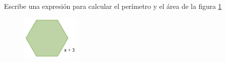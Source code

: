 \question[10] Escribe una expresión para calcular el perímetro y el área de la figura \ref{fig:20230319032932}

\begin{figure}[H]
    \centering
    \includegraphics[width=0.25\textwidth]{../images/20230319032932}
    \caption{}
    \label{fig:20230319032932}
\end{figure}
